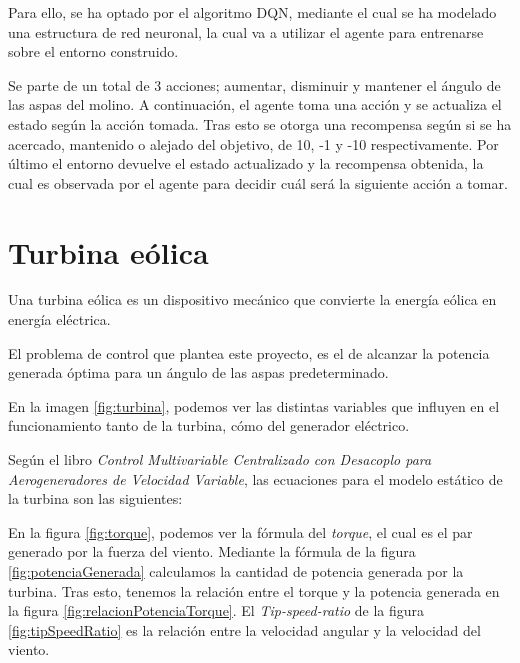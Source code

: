 Para ello, se ha optado por el algoritmo DQN, mediante el cual se ha modelado una estructura de red neuronal, la cual va a utilizar el agente para entrenarse sobre el entorno construido.

Se parte de un total de 3 acciones; aumentar, disminuir y mantener el ángulo de las aspas del molino. A continuación, el agente toma una acción y se actualiza el estado según la acción tomada. Tras esto se otorga una recompensa según si se ha acercado, mantenido o alejado del objetivo, de 10, -1 y -10 respectivamente.
Por último el entorno devuelve el estado actualizado y la recompensa obtenida, la cual es observada por el agente para decidir cuál será la siguiente acción a tomar.


\section{Turbina eólica}

Una turbina eólica es un dispositivo mecánico que convierte la energía eólica en energía eléctrica.

El problema de control que plantea este proyecto, es el de alcanzar la potencia generada óptima para un ángulo de las aspas predeterminado.

\label{fig:turbina}

En la imagen \ref{fig:turbina}, podemos ver las distintas variables que influyen en el funcionamiento tanto de la turbina, cómo del generador eléctrico.

Según el libro \textit{Control Multivariable Centralizado con Desacoplo para Aerogeneradores de Velocidad Variable}\cite{control_multivariable}, las ecuaciones para el modelo estático de la turbina son las siguientes:

\label{fig:torque}

\label{fig:potenciaGenerada}

\label{fig:relacionPotenciaTorque}

\label{fig:tipSpeedRatio}

En la figura \ref{fig:torque}, podemos ver la fórmula del \textit{torque}, el cual es el par generado por la fuerza del viento.
Mediante la fórmula de la figura \ref{fig:potenciaGenerada} calculamos la cantidad de potencia generada por la turbina.
Tras esto, tenemos la relación entre el torque y la potencia generada en la figura \ref{fig:relacionPotenciaTorque}.
El \textit{Tip-speed-ratio} de la figura \ref{fig:tipSpeedRatio} es la relación entre la velocidad angular y la velocidad del viento.

